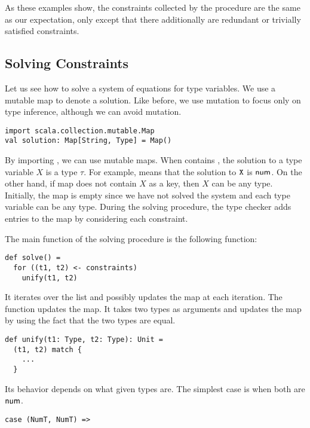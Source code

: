 As these examples show, the constraints collected by the procedure are the same as
our expectation, only except that there additionally are redundant or
trivially satisfied constraints.

\subsection{Solving Constraints}

Let us see how to solve a system of equations for type variables. We use a
mutable map to denote a solution. Like before, we use mutation to focus only on
type inference, although we can avoid mutation.

\begin{verbatim}
import scala.collection.mutable.Map
val solution: Map[String, Type] = Map()
\end{verbatim}

By importing , we can use mutable maps.  When
 contains , the solution to a type variable
$X$ is a type $\tau$. For example,  means that the solution to
$\texttt{X}$ is $\textsf{num}$. On the other hand, if map does not contain $X$ as a key, then
$X$ can be any type. Initially, the map is empty since we have not solved the
system and each type variable can be any type. During the solving procedure,
the type checker adds entries to the map by considering each constraint.

The main function of the solving procedure is the following 
function:

\begin{verbatim}
def solve() =
  for ((t1, t2) <- constraints)
    unify(t1, t2)
\end{verbatim}

It iterates over the  list and possibly updates the
 map at each iteration. The  function updates the
map. It takes two types as arguments and updates the map by using the fact that
the two types are equal.

\begin{verbatim}
def unify(t1: Type, t2: Type): Unit =
  (t1, t2) match {
    ...
  }
\end{verbatim}

Its behavior depends on what given types are. The simplest case is
when both are $\textsf{num}$.

\begin{verbatim}
case (NumT, NumT) =>
\end{verbatim}

